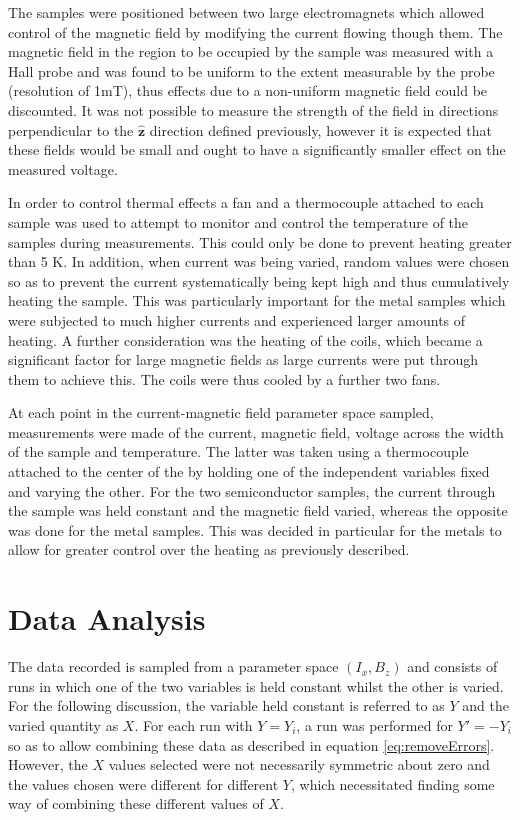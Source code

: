 \documentclass{article}
\begin{document}
		The samples were positioned between two large electromagnets which allowed control of the magnetic field by modifying the current flowing though them. The magnetic field in the region to be occupied by the sample was measured with a Hall probe and was found to be uniform to the extent measurable by the probe (resolution of 1mT), thus effects due to a non-uniform magnetic field could be discounted. It was not possible to measure the strength of the field in directions perpendicular to the $\hat{\mathbf{z}}$ direction defined previously, however it is expected that these fields would be small and ought to have a significantly smaller effect on the measured voltage.
		
		In order to control thermal effects a fan and a thermocouple attached to each sample was used to attempt to monitor and control the temperature of the samples during measurements. This could only be done to prevent heating greater than 5 K. In addition, when current was being varied, random values were chosen so as to prevent the current systematically being kept high and thus cumulatively heating the sample. This was particularly important for the metal samples which were subjected to much higher currents and experienced larger amounts of heating. A further consideration was the heating of the coils, which became a significant factor for large magnetic fields as large currents were put through them to achieve this. The coils were thus cooled by a further two fans.
		
		At each point in the current-magnetic field parameter space sampled, measurements were made of the current, magnetic field, voltage across the width of the sample and temperature. The latter was taken using a thermocouple attached to the center of the by holding one of the independent variables fixed and varying the other. For the two semiconductor samples, the current through the sample was held constant and the magnetic field varied, whereas the opposite was done for the metal samples. This was decided in particular for the metals to allow for greater control over the heating as previously described.
	
	\section{Data Analysis}
		The data recorded is sampled from a parameter space $(I_x,B_z)$ and consists of runs in which one of the two variables is held constant whilst the other is varied. For the following discussion, the variable held constant is referred to as $Y$ and the varied quantity as $X$. For each run with $Y = Y_i$, a run was performed for $Y' = -Y_i$ so as to allow combining these data as described in equation \ref{eq:removeErrors}. However, the $X$ values selected were not necessarily symmetric about zero and the values chosen were different for different $Y$, which necessitated finding some way of combining these different values of $X$.
		
\end{document}
